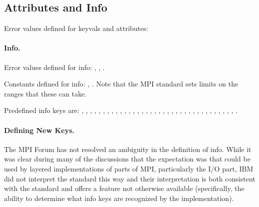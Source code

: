 \documentclass{article}
\begin{document}
\subsection{Attributes and Info}

Error values defined for keyvals and attributes:

\paragraph{Info.}

Error values defined for info:
,
,
.

Constants defined for info: 
,
.
Note that the MPI standard sets limits on the ranges that these can take.

Predefined info keys are:
, 
, 
, 
, 
, 
, 
, 
, 
, 
, 
, 
, 
, 
, 
, 
, 
, 
, 
, 
, 
, 
, 
, 
, 
, 
, 
, 
, 
, 
, 
, 
, 
, 
, 
, 
, 
.

\paragraph{Defining New Keys.}
The MPI Forum has not resolved an ambiguity in the definition of
info.  While it was clear during many of the discussions that the
expectation was that  could be used by
layered implementations of parts of MPI, particularly the I/O part,
IBM did not interpret the standard this way and their interpretation
is both consistent with the standard and offers a feature not
otherwise available (specifically, the ability to determine what info
keys are recognized by the implementation).
\end{document}
